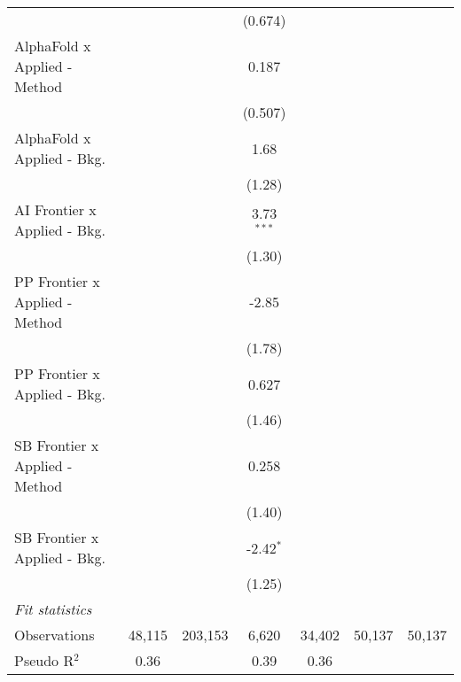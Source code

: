 \begin{tabular}{lcccccc}
                                  &               &         & (0.674)        &               &        &   \\   
   AlphaFold x Applied - Method   &               &         & 0.187          &               &        &   \\   
                                  &               &         & (0.507)        &               &        &   \\   
   AlphaFold x Applied - Bkg.     &               &         & 1.68           &               &        &   \\   
                                  &               &         & (1.28)         &               &        &   \\   
   AI Frontier x Applied - Bkg.   &               &         & 3.73$^{***}$   &               &        &   \\   
                                  &               &         & (1.30)         &               &        &   \\   
   PP Frontier x Applied - Method &               &         & -2.85          &               &        &   \\   
                                  &               &         & (1.78)         &               &        &   \\   
   PP Frontier x Applied - Bkg.   &               &         & 0.627          &               &        &   \\   
                                  &               &         & (1.46)         &               &        &   \\   
   SB Frontier x Applied - Method &               &         & 0.258          &               &        &   \\   
                                  &               &         & (1.40)         &               &        &   \\   
   SB Frontier x Applied - Bkg.   &               &         & -2.42$^{*}$    &               &        &   \\   
                                  &               &         & (1.25)         &               &        &   \\   
   \midrule
   \emph{Fit statistics}\\
   Observations                   & 48,115        & 203,153 & 6,620          & 34,402        & 50,137 & 50,137\\  
   Pseudo R$^2$                   & 0.36          &         & 0.39           & 0.36          &        & \\  
   

\end{tabular}

